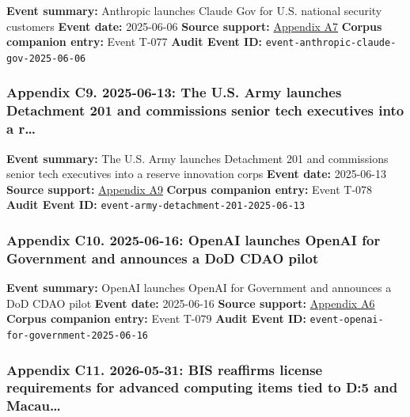 \documentclass[
  american,
  11pt,
  letterpaper,
]{article}
\begin{document}
\textbf{Event summary:} Anthropic launches Claude Gov for U.S. national
security customers \textbf{Event date:} 2025-06-06 \textbf{Source
support:}
\hyperref[ch-07-appendix-a7-claude-gov-models-for-u-s-national-security-customers]{Appendix
A7} \textbf{Corpus companion entry:} Event T-077 \textbf{Audit Event
ID:} \texttt{event-anthropic-claude-gov-2025-06-06}

\subsubsection{Appendix C9. 2025-06-13: The U.S. Army launches
Detachment 201 and commissions senior tech executives into a
r\ldots{}}\label{ch-07-appendix-c9-2025-06-13-the-u-s-army-launches-detachment-201-and-commissions-senior-tech-executives-into-a-reserve-innovation-corps}

\textbf{Event summary:} The U.S. Army launches Detachment 201 and
commissions senior tech executives into a reserve innovation corps
\textbf{Event date:} 2025-06-13 \textbf{Source support:}
\hyperref[ch-07-appendix-a9-army-launches-detachment-201-executive-innovation-corps-to-drive-tech-transformation]{Appendix
A9} \textbf{Corpus companion entry:} Event T-078 \textbf{Audit Event
ID:} \texttt{event-army-detachment-201-2025-06-13}

\subsubsection{Appendix C10. 2025-06-16: OpenAI launches OpenAI for
Government and announces a DoD CDAO
pilot}\label{ch-07-appendix-c10-2025-06-16-openai-launches-openai-for-government-and-announces-a-dod-cdao-pilot}

\textbf{Event summary:} OpenAI launches OpenAI for Government and
announces a DoD CDAO pilot \textbf{Event date:} 2025-06-16
\textbf{Source support:}
\hyperref[ch-07-appendix-a6-introducing-openai-for-government]{Appendix
A6} \textbf{Corpus companion entry:} Event T-079 \textbf{Audit Event
ID:} \texttt{event-openai-for-government-2025-06-16}

\subsubsection{Appendix C11. 2026-05-31: BIS reaffirms license
requirements for advanced computing items tied to D:5 and
Macau\ldots{}}\label{ch-07-appendix-c11-2026-05-31-bis-reaffirms-license-requirements-for-advanced-computing-items-tied-to-d-5-and-macau-entities}
\end{document}
